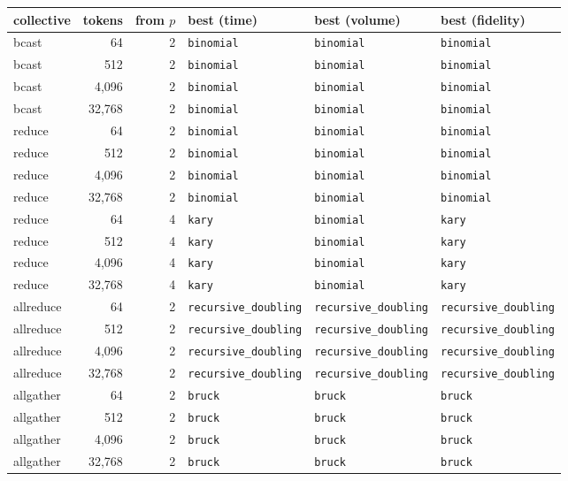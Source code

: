 \begin{tabular}{lrrlll}
\toprule
collective & tokens & from $p$ & best (time) & best (volume) & best (fidelity) \\
\midrule
bcast & 64 & 2 & \texttt{binomial} & \texttt{binomial} & \texttt{binomial} \\
bcast & 512 & 2 & \texttt{binomial} & \texttt{binomial} & \texttt{binomial} \\
bcast & 4,096 & 2 & \texttt{binomial} & \texttt{binomial} & \texttt{binomial} \\
bcast & 32,768 & 2 & \texttt{binomial} & \texttt{binomial} & \texttt{binomial} \\
reduce & 64 & 2 & \texttt{binomial} & \texttt{binomial} & \texttt{binomial} \\
reduce & 512 & 2 & \texttt{binomial} & \texttt{binomial} & \texttt{binomial} \\
reduce & 4,096 & 2 & \texttt{binomial} & \texttt{binomial} & \texttt{binomial} \\
reduce & 32,768 & 2 & \texttt{binomial} & \texttt{binomial} & \texttt{binomial} \\
reduce & 64 & 4 & \texttt{kary} & \texttt{binomial} & \texttt{kary} \\
reduce & 512 & 4 & \texttt{kary} & \texttt{binomial} & \texttt{kary} \\
reduce & 4,096 & 4 & \texttt{kary} & \texttt{binomial} & \texttt{kary} \\
reduce & 32,768 & 4 & \texttt{kary} & \texttt{binomial} & \texttt{kary} \\
allreduce & 64 & 2 & \texttt{recursive\_doubling} & \texttt{recursive\_doubling} & \texttt{recursive\_doubling} \\
allreduce & 512 & 2 & \texttt{recursive\_doubling} & \texttt{recursive\_doubling} & \texttt{recursive\_doubling} \\
allreduce & 4,096 & 2 & \texttt{recursive\_doubling} & \texttt{recursive\_doubling} & \texttt{recursive\_doubling} \\
allreduce & 32,768 & 2 & \texttt{recursive\_doubling} & \texttt{recursive\_doubling} & \texttt{recursive\_doubling} \\
allgather & 64 & 2 & \texttt{bruck} & \texttt{bruck} & \texttt{bruck} \\
allgather & 512 & 2 & \texttt{bruck} & \texttt{bruck} & \texttt{bruck} \\
allgather & 4,096 & 2 & \texttt{bruck} & \texttt{bruck} & \texttt{bruck} \\
allgather & 32,768 & 2 & \texttt{bruck} & \texttt{bruck} & \texttt{bruck} \\

\end{tabular}
